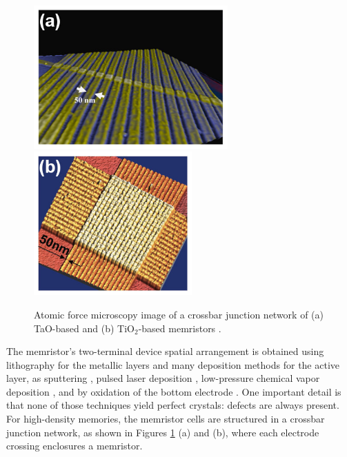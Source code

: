 \begin{center}
  \begin{figure}[h!]
    \begin{center}

      \includegraphics[height=5.5cm]{img/MiaoNanotechnology2011.jpg}
      \includegraphics[height=5.5cm]{img/MiaoAdvMat2011.jpg}
      \caption{Atomic force microscopy image of a crossbar junction network of (a) TaO-based \cite{Miao2011a} and (b) TiO$_2$-based memristors \cite{Miao2011b}.} 
      \label{fig:sketch-mem} 
    \end{center}
  \end{figure}
\end{center}

The memristor's two-terminal device spatial arrangement is obtained using lithography for the metallic layers and many deposition methods for the active layer, as sputtering \cite{Miao2011b}, pulsed laser deposition \cite{Muenstermann2010}, low-pressure chemical vapor deposition \cite{Chang2013}, and by oxidation of the bottom electrode \cite{Jeong2012}. One important detail is that none of those techniques yield perfect crystals: defects are always present. For high-density memories, the memristor cells are structured in a crossbar junction network, as shown in Figures \ref{fig:sketch-mem} (a) and (b), where each electrode crossing enclosures a memristor.

